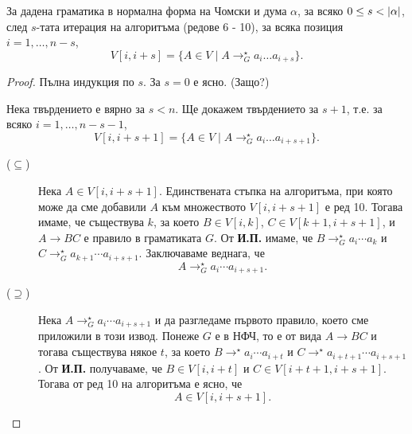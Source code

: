\begin{lemma}
  За дадена граматика в нормална форма на Чомски и дума $\alpha$, 
  за всяко $0 \leq s < \lvert{\alpha}\rvert$, след $s$-тата итерация на алгоритъма (редове 6 - 10), за всяка позиция $i = 1,\dots,n-s$,
  \[V[i,i+s] = \{A \in V \mid A \rightarrow^\star_G a_i\dots a_{i+s}\}.\]
\end{lemma}
\begin{proof}
  Пълна индукция по $s$.
  За $s = 0$  е ясно. (Защо?)

  Нека твърдението е вярно за $s < n$. Ще докажем твърдението за $s+1$, т.е. за всяко $i = 1,\dots,n-s-1$,
  \[V[i,i+s+1] = \{A \in V \mid A \rightarrow^\star_G a_i\dots a_{i+s+1}\}.\]
  \begin{description}
  \item[($\subseteq$)]
    Нека $A \in V[i,i+s+1]$.
    Единствената стъпка на алгоритъма, при която може да сме добавили $A$ към множеството $V[i,i+s+1]$ е ред 10.
    Тогава имаме, че съществува $k$, за което $B \in V[i,k]$, $C \in V[k+1,i+s+1]$, и $A\to BC$ е правило в граматиката $G$.
    От {\bf И.П.} имаме, че $B \to^\star_G a_i\cdots a_k$ и $C \to^\star_G a_{k+1}\cdots a_{i+s+1}$.
    Заключаваме веднага, че 
    \[A \to^\star_G a_i\cdots a_{i+s+1}.\]
  \item[($\supseteq$)]
    Нека $A \to^\star_G a_i\cdots a_{i+s+1}$ и да разгледаме първото правило, което сме приложили в този извод.
    Понеже $G$ е в НФЧ, то е от вида $A \to BC$ и тогава съществува някое $t$, за което 
    $B \to^\star a_i\cdots a_{i+t}$ и $C \to^\star a_{i+t+1}\cdots a_{i+s+1}$.
    От {\bf И.П.} получаваме, че $B \in V[i,i+t]$ и $C \in V[i+t+1,i+s+1]$.
    Тогава от ред 10 на алгоритъма е ясно, че 
    \[A \in V[i,i+s+1].\]
  \end{description}
\end{proof}


